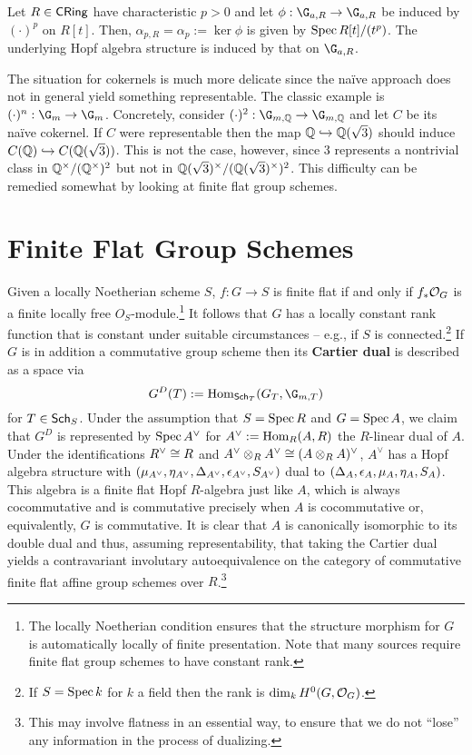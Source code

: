 \documentclass[11pt]{article}
\begin{document}
\begin{example}
Let $R\in\operatorname{\mathsf{CRing}}$ have characteristic $p>0$ and let $\phi: \G_{a,R}\to\G_{a,R}$ be induced by $(\cdot)^p$ on $R[t]$. Then, $\alpha_{p,R}=\alpha_p:=\ker\phi$ is given by $\operatorname{Spec} R[t]/(t^p)$. The underlying Hopf algebra structure is induced by that on $\G_{a,R}$.
\end{example}

The situation for cokernels is much more delicate since the na\"{i}ve approach does not in general yield something representable. The classic example is $(\cdot)^n: \G_m\to\G_m$. Concretely, consider $(\cdot)^2: \G_{m,\Q}\to\G_{m,\Q}$ and let $C$ be its na\"{i}ve cokernel. If $C$ were representable then the map $\mathbb{Q}\hookrightarrow\mathbb{Q}(\sqrt{3})$ should induce $C(\mathbb{Q})\hookrightarrow C(\mathbb{Q}(\sqrt{3}))$. This is not the case, however, since $3$ represents a nontrivial class in $\mathbb{Q}^{\times}/(\mathbb{Q}^{\times})^2$ but not in $\mathbb{Q}(\sqrt{3})^{\times}/(\mathbb{Q}(\sqrt{3})^{\times})^2$. This difficulty can be remedied somewhat by looking at finite flat group schemes.

\section{Finite Flat Group Schemes}
Given a locally Noetherian scheme $S$, $f: G\to S$ is finite flat if and only if $f_*\mathcal{O}_G$ is a finite locally free $O_S$-module.\footnote{The locally Noetherian condition ensures that the structure morphism for $G$ is automatically locally of finite presentation. Note that many sources require finite flat group schemes to have constant rank.} It follows that $G$ has a locally constant rank function that is constant under suitable circumstances -- e.g., if $S$ is connected.\footnote{If $S=\operatorname{Spec} k$ for $k$ a field then the rank is $\dim_kH^0(G,\mathcal{O}_G)$.} If $G$ is in addition a commutative group scheme then its \textbf{Cartier dual} is described as a space via
$$G^D(T):=\Hom_{\Sch_T}(G_T,\G_{m,T})$$
for $T\in\operatorname{\mathsf{Sch}}_S$. Under the assumption that $S=\operatorname{Spec} R$ and $G=\operatorname{Spec} A$, we claim that $G^D$ is represented by $\operatorname{Spec} A^{\vee}$ for $A^{\vee}:=\operatorname{Hom}_R(A,R)$ the $R$-linear dual of $A$. Under the identifications $R^{\vee}\cong R$ and $A^{\vee}\otimes_RA^{\vee}\cong(A\otimes_RA)^{\vee}$, $A^{\vee}$ has a Hopf algebra structure with $(\mu_{A^{\vee}},\eta_{A^{\vee}},\Delta_{A^{\vee}},\epsilon_{A^{\vee}},S_{A^{\vee}})$ dual to $(\Delta_A,\epsilon_A,\mu_A,\eta_A,S_A)$. This algebra is a finite flat Hopf $R$-algebra just like $A$, which is always cocommutative and is commutative precisely when $A$ is cocommutative or, equivalently, $G$ is commutative. It is clear that $A$ is canonically isomorphic to its double dual and thus, assuming representability, that taking the Cartier dual yields a contravariant involutary autoequivalence on the category of commutative finite flat affine group schemes over $R$.\footnote{This may involve flatness in an essential way, to ensure that we do not ``lose'' any information in the process of dualizing.}
\end{document}
